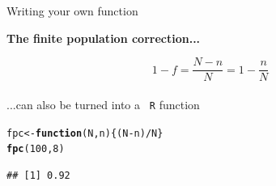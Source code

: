 \documentclass[11pt,german,hideothersubsections]{beamer}\usepackage[]{graphicx}\usepackage[]{color}
\makeatletter
\newcommand{\hlnum}[1]{\textcolor[rgb]{0.686,0.059,0.569}{#1}}%
\newcommand{\hlopt}[1]{\textcolor[rgb]{0,0,0}{#1}}%
\newcommand{\hlstd}[1]{\textcolor[rgb]{0.345,0.345,0.345}{#1}}%
\newcommand{\hlkwa}[1]{\textcolor[rgb]{0.161,0.373,0.58}{\textbf{#1}}}%
\newcommand{\hlkwb}[1]{\textcolor[rgb]{0.69,0.353,0.396}{#1}}%
\newcommand{\hlkwc}[1]{\textcolor[rgb]{0.333,0.667,0.333}{#1}}%
\newcommand{\hlkwd}[1]{\textcolor[rgb]{0.737,0.353,0.396}{\textbf{#1}}}%
\newenvironment{kframe}{%
 \def\at@end@of@kframe{}%
 \ifinner\ifhmode%
  \def\at@end@of@kframe{\end{minipage}}%
  \begin{minipage}{\columnwidth}%
 \fi\fi%
 \def\FrameCommand##1{\hskip\@totalleftmargin \hskip-\fboxsep
 \colorbox{shadecolor}{##1}\hskip-\fboxsep
     \hskip-\linewidth \hskip-\@totalleftmargin \hskip\columnwidth}%
 \MakeFramed {\advance\hsize-\width
   \@totalleftmargin\z@ \linewidth\hsize
   \@setminipage}}%
 {\par\unskip\endMakeFramed%
 \at@end@of@kframe}
\newenvironment{knitrout}{}{} %
\newcommand{\R}[1]{{\tt \color{blue}  #1}}
\makeatother
\begin{document}
\begin{frame}[fragile]{Writing your own function}
\begin{center}
\textbf{The finite population correction...}
\end{center}
\vspace{.25cm}
\begin{equation*}
1-f=\frac{N-n}{N}=1-\frac{n}{N}
\end{equation*}\\
\vspace{.5cm}
...can also be turned into a \R{R} function
\begin{knitrout}
\color{fgcolor}\begin{kframe}
\begin{alltt}
\hlstd{fpc} \hlkwb{<-} \hlkwa{function}\hlstd{(}\hlkwc{N}\hlstd{,}\hlkwc{n}\hlstd{)\{(N}\hlopt{-}\hlstd{n)}\hlopt{/}\hlstd{N\}}
\hlkwd{fpc}\hlstd{(}\hlnum{100}\hlstd{,}\hlnum{8}\hlstd{)}
\end{alltt}
\begin{verbatim}
## [1] 0.92
\end{verbatim}
\end{kframe}
\end{knitrout}
\end{frame}
\end{document}
